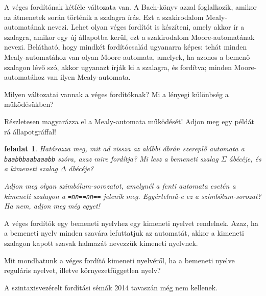 \documentclass[a4paper]{article}
\newtheorem{feladat}{feladat}[section]
\begin{document}
A véges fordítónak kétféle változata van. A Bach-könyv azzal
foglalkozik, amikor az átmenetek során történik a szalagra írás. Ezt a
szakirodalom Mealy-automatának nevezi. Lehet olyan véges fordítót is
készíteni, amely akkor ír a szalagra, amikor egy új állapotba kerül, ezt
a szakirodalom Moore-automatának nevezi. Belátható, hogy mindkét
fordítócsalád ugyanarra képes: tehát minden Mealy-automatához van olyan
Moore-automata, amelyek, ha azonos a bemenő szalagon lévő szó, akkor
ugyanazt írják ki a szalagra, és fordítva; minden Moore-automatához van
ilyen Mealy-automata. 

Milyen változatai vannak a véges fordítóknak? Mi a lényegi különbség a
működésükben?

Részletesen magyarázza el a Mealy-automata működését! Adjon meg egy
példát rá állapotgráffal!

\begin{feladat}
Határozza meg, mit ad vissza az alábbi ábrán szereplő automata
a \verb!baabbbaabaaabb!  szóra, azaz mire fordítja?
Mi lesz a bemeneti szalag $\Sigma$ ábécéje, és a kimeneti szalag
$\Delta$ ábécéje?


Adjon meg olyan szimbólum-sorozatot, amelynél a fenti automata esetén a
kimeneti szalagon a \verb+=nn==nn==+ jelenik meg. Egyértelmű-e ez a
szimbólum-sorozat? Ha nem, adjon meg még egyet!
\end{feladat}

A véges fordítók egy bemeneti nyelvhez egy kimeneti nyelvet rendelnek.
Azaz, ha a bemeneti nyelv minden szavára lefuttatjuk az automatát,
akkor a kimeneti szalagon kapott szavak halmazát nevezzük kimeneti
nyelvnek.

Mit mondhatunk a véges fordító kimeneti nyelvéről,
ha a bemeneti nyelve reguláris nyelvet, illetve környezetfüggetlen
nyelv?

A szintaxisvezérelt fordítási sémák 2014 tavaszán még nem kellenek.
\end{document}
